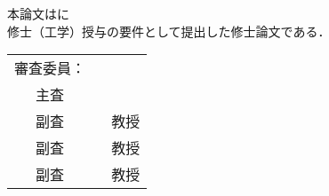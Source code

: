 \renewcommand\thepage{Title2}
\thispagestyle{empty}
\vspace*{8cm}

\begin{center}
	本論文は\jaffuniv \jaffgs に$\ $ \\
	修士（工学）授与の要件として提出した修士論文である．
	\bigskip
	\jauthor
	\vspace*{0.4cm}
	\begin{table}[h]
		\begin{center}
			\begin{tabular}[t]{p{}ll}
				\multicolumn{2}{l}{審査委員：} \\
				& 主査 & \jsupervisor \\
				& 副査 & ~ 教授 \\
				& 副査 & ~ 教授 \\
				& 副査 & ~ 教授 \\ 
			\end{tabular}
		\end{center}
	\end{table}
\end{center}
